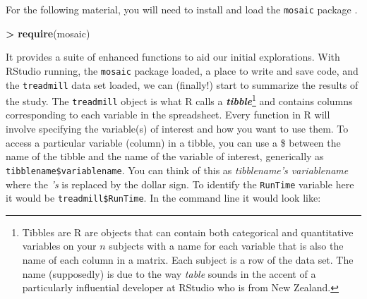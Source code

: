 \documentclass[]{book}
\newenvironment{Shaded}{\begin{snugshade}}{\end{snugshade}}
\newcommand{\DecValTok}[1]{\textcolor[rgb]{0.00,0.00,0.81}{#1}}
\newcommand{\FloatTok}[1]{\textcolor[rgb]{0.00,0.00,0.81}{#1}}
\newcommand{\KeywordTok}[1]{\textcolor[rgb]{0.13,0.29,0.53}{\textbf{#1}}}
\newcommand{\NormalTok}[1]{#1}
\newcommand{\OperatorTok}[1]{\textcolor[rgb]{0.81,0.36,0.00}{\textbf{#1}}}
\newcommand{\StringTok}[1]{\textcolor[rgb]{0.31,0.60,0.02}{#1}}
\let\rmarkdownfootnote\footnote%
\def\footnote{\protect\rmarkdownfootnote}
\renewenvironment{Shaded}{%
\setlength{\FrameRule}{1.5pt}
\def\FrameCommand{\fboxrule=\FrameRule\fboxsep=5pt 
                  \fcolorbox{framecolor}{shadecolor}}%
\MakeFramed {\FrameRestore}}%
{\endMakeFramed}
\begin{document}
For the following material, you will need to install and load the \texttt{mosaic} package \citep{R-mosaic}.


\begin{Shaded}
\begin{Highlighting}[]
\OperatorTok{>}\StringTok{ }\KeywordTok{require}\NormalTok{(mosaic)}
\end{Highlighting}
\end{Shaded}

It provides a suite of enhanced functions to aid our initial explorations. With RStudio running, the \texttt{mosaic} package loaded, a place to write and
save code, and the \texttt{treadmill} data set loaded, we can (finally!) start to
summarize the results of the study. The \texttt{treadmill} object is what R calls a
\textbf{\emph{tibble}}\footnote{Tibbles are R are objects that can contain both
  categorical and quantitative variables on your \(n\) subjects with a name for each
  variable that is also the name of each column in a matrix.  Each subject is a
  row of the data set. The name (supposedly) is due to the way \emph{table} sounds in the accent of a particularly influential developer at RStudio who is from New Zealand.} and contains columns corresponding to each variable in
the spreadsheet. Every
function in R will involve specifying the variable(s) of interest and how you
want to use them. To access a particular variable (column) in a tibble, you
can use a \$ between the name of the tibble and the name of the variable of
interest, generically as \texttt{tibblename\$variablename}. You can think of this as \emph{tibblename's variablename} where the \emph{'s} is replaced by the dollar sign. To identify the
\texttt{RunTime} variable here it would be \texttt{treadmill\$RunTime}. In the command line it would look like:

\begin{Shaded}
\end{Shaded}
\end{document}
